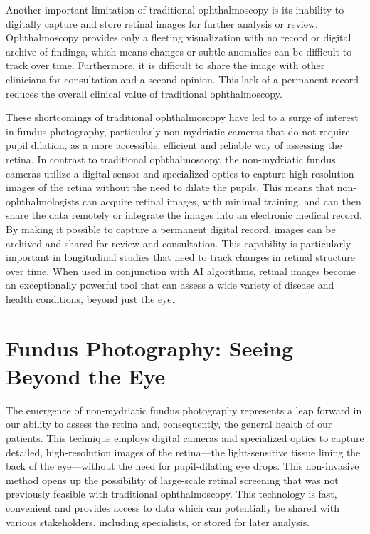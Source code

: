 \documentclass[
  Letterpaper,
]{scrbook}
\begin{document}
Another important limitation of traditional ophthalmoscopy is its
inability to digitally capture and store retinal images for further
analysis or review. Ophthalmoscopy provides only a fleeting
visualization with no record or digital archive of findings, which means
changes or subtle anomalies can be difficult to track over time.
Furthermore, it is difficult to share the image with other clinicians
for consultation and a second opinion. This lack of a permanent record
reduces the overall clinical value of traditional ophthalmoscopy.

These shortcomings of traditional ophthalmoscopy have led to a surge of
interest in fundus photography, particularly non-mydriatic cameras that
do not require pupil dilation, as a more accessible, efficient and
reliable way of assessing the retina. In contrast to traditional
ophthalmoscopy, the non-mydriatic fundus cameras utilize a digital
sensor and specialized optics to capture high resolution images of the
retina without the need to dilate the pupils. This means that
non-ophthalmologists can acquire retinal images, with minimal training,
and can then share the data remotely or integrate the images into an
electronic medical record. By making it possible to capture a permanent
digital record, images can be archived and shared for review and
consultation. This capability is particularly important in longitudinal
studies that need to track changes in retinal structure over time. When
used in conjunction with AI algorithms, retinal images become an
exceptionally powerful tool that can assess a wide variety of disease
and health conditions, beyond just the eye.

\section{Fundus Photography: Seeing Beyond the
Eye}\label{fundus-photography-seeing-beyond-the-eye}

The emergence of non-mydriatic fundus photography represents a leap
forward in our ability to assess the retina and, consequently, the
general health of our patients. This technique employs digital cameras
and specialized optics to capture detailed, high-resolution images of
the retina---the light-sensitive tissue lining the back of the
eye---without the need for pupil-dilating eye drops. This non-invasive
method opens up the possibility of large-scale retinal screening that
was not previously feasible with traditional ophthalmoscopy. This
technology is fast, convenient and provides access to data which can
potentially be shared with various stakeholders, including specialists,
or stored for later analysis.
\end{document}
